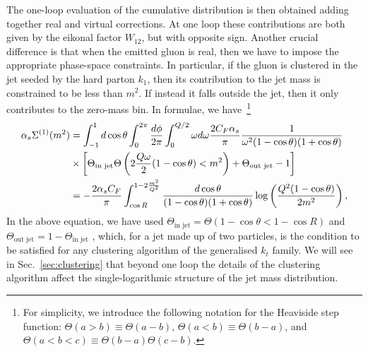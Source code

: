 The one-loop evaluation of the cumulative distribution is then obtained adding together real and virtual corrections. At one loop these contributions are both given by the eikonal factor $W_{12}$, but with opposite sign. Another crucial difference is that when the emitted gluon is real, then we have to impose the appropriate phase-space constraints. 
%
In particular, if the gluon is clustered in the jet seeded by the hard parton $k_1$, then its contribution to the jet mass is constrained to be less than $m^2$. 
%
If instead it falls outside the jet, then it only contributes to the zero-mass bin. 
%
In formulae, we have~\footnote{For simplicity, we introduce the
  following notation for the Heaviside step function:
  $\Theta\left( a>b\right)\equiv \Theta\left( a-b\right)$,
  $\Theta\left( a<b\right)\equiv \Theta\left( b-a\right)$, and
  $\Theta\left( a<b<c\right)\equiv \Theta\left(b-a \right)
  \Theta\left(c-b \right)$.  }
\begin{align}\label{eq:sigma-1-loop-begin}
\alpha_s \Sigma^{(1)}(m^2)&=\int_{-1}^1 d \cos \theta \int_0^{2 \pi} \frac{d \phi}{2 \pi} \int_0^{Q/2} \omega d \omega
\frac{2 C_F \alpha_s}{\pi} \frac{1}{\omega^2 (1-\cos \theta)(1+\cos \theta)} 
\nonumber \\ & \times
\left[ \Theta_\text{in jet} \Theta \left(2\frac{Q \omega}{2}(1-\cos \theta) < m^2 \right)
+\Theta_\text{out jet} -1\right]\nonumber\\
&= - \frac{2 \alpha_s C_F}{\pi} \int_{\cos R}^{1- 2 \frac{m^2}{Q^2}} 
\frac{d \cos \theta }{(1-\cos \theta)(1+\cos \theta)} \log\left( \frac{Q^2 (1- \cos \theta)}{2 m^2}\right),
\end{align}
In the above equation, we have used $\Theta_\text{in jet}=\Theta\left(1-\cos \theta< 1-\cos R \right)$ and $\Theta_\text{out jet}=1-\Theta_\text{in jet}$ , which, for a jet made up of two particles, is the condition to be satisfied for any clustering algorithm of the generalised $k_t$ family. We will see in Sec.~\ref{sec:clustering} that beyond one loop the details of the clustering algorithm affect the single-logarithmic structure of the jet mass distribution.

